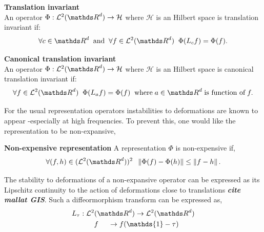 \documentclass[a4paper,11pt]{report}
\begin{document}
      \begin{prop} \textbf{Translation invariant}\\ 
				An operator $\Phi: \mathcal{L}^{2}(\dsR^{d}) \rightarrow \mathcal{H}$ where $\mathcal{H}$ is an Hilbert space is translation invariant if:
	      	\begin{equation*}
			  		\forall c \in \dsR^{d} 
			  		\;\; \text{and}  \;\;
			  		\forall f \in \mathcal{L}^{2}(\dsR^{d}) \;\;
			  		\Phi(L_{c}f) = \Phi(f).
				\end{equation*}
				\label{pty:Translation invariance - intuition}
      \end{prop}
      \vspace{-30pt}
      \begin{prop} \textbf{Canonical translation invariant}\\ 
				An operator $\Phi: \mathcal{L}^{2}(\dsR^{d}) \rightarrow \mathcal{H}$ where $\mathcal{H}$ is an Hilbert space is canonical translation invariant if:
        \begin{equation*}
			  		\forall f \in \mathcal{L}^{2}(\dsR^{d}) \;\;
			  		\Phi(L_{a}f) = \Phi(f) 
			  		\;\; \text{where} \; a \in \dsR^{d} \; \text{is function of} \; f.
				\end{equation*}
				\label{pty:Canonical translation invariance - intuition}
      \end{prop}
      
      For the usual representation operators instabilities to deformations are known to appear -especially at high frequencies. To prevent this, one would like the representation to be non-expansive,
      
      \begin{defn} \textbf{Non-expensive representation}
				A representation $\Phi$ is non-expensive if,
				\begin{equation}
			  		\forall (f,h) \in (\mathcal{L}^{2}(\dsR^{d}))^{2} \;\; 
			  		\norm{\Phi(f) - \Phi(h)} \leq \norm{f-h}.
				\end{equation}
				\label{def:Non-expansivity - intuition}
      \end{defn}
      
      The stability to deformations of a non-expansive operator can be expressed as its Lipschitz continuity to the action of deformations close to translations \textbf{\textit{cite mallat GIS}}. Such a diffeormorphism transform can be expressed as,
      \begin{equation*}
      		\begin{split}
      			L_{\tau}	: \; & \mathcal{L}^{2}(\dsR^{d}) \rightarrow \mathcal{L}^{2}(\dsR^{d})\\
      							  & \;\;\;\; f \;\;\;\;\; \rightarrow  f(\mathds{1} - \tau)
				\end{split}
      \end{equation*}
\end{document}
